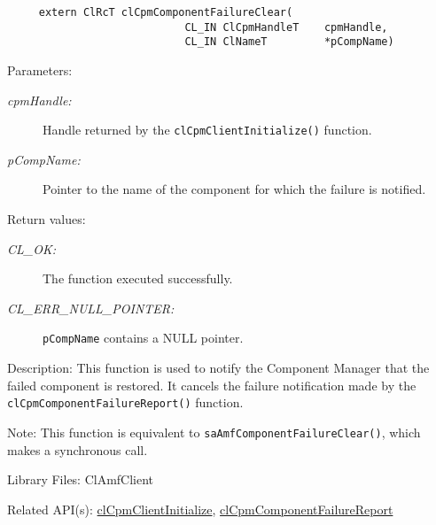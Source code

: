 {\begin{Desc}
\footnotesize\begin{verbatim}     extern ClRcT clCpmComponentFailureClear(
                			CL_IN ClCpmHandleT    cpmHandle,
                			CL_IN ClNameT         *pCompName)
\end{verbatim}
\normalsize
\end{Desc}
\begin{Desc}
\item[Parameters:]
\begin{description}
\item[{\em cpm\-Handle:}]Handle returned by the {\tt{cl\-Cpm\-Client\-Initialize()}} function. 
\item[{\em p\-Comp\-Name:}]Pointer to the name of the component for which the failure is notified.\end{description}
\end{Desc}
\begin{Desc}
\item[Return values:]
\begin{description}
\item[{\em CL\_\-OK:}]The function executed successfully. 
\item[{\em CL\_\-ERR\_\-NULL\_\-POINTER:}]{\tt{pCompName}} contains a NULL pointer.\end{description}
\end{Desc}
\begin{Desc}
\item[Description:]This function is used to notify the Component Manager that the failed component is restored. It cancels the failure notification made
by the {\tt{cl\-Cpm\-Component\-Failure\-Report()}} function.\end{Desc}
\begin{Desc}
\item[Note:]This function is equivalent to {\tt{sa\-Amf\-Component\-Failure\-Clear()}}, which makes a synchronous call.\end{Desc}
\begin{Desc}
\item[Library Files:]Cl\-Amf\-Client\end{Desc}

\begin{Desc}
\item[Related API(s):]\hyperlink{group__group14}{cl\-Cpm\-Client\-Initialize}, \hyperlink{group__group14}{cl\-Cpm\-Component\-Failure\-Report} \end{Desc}

\newpage






}
